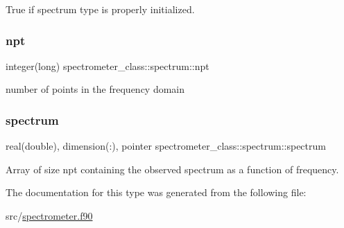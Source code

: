 True if spectrum type is properly initialized. 

\mbox{\label{structspectrometer__class_1_1spectrum_a082d9e0f82565526a83b32fae38df78f}} 
\subsubsection{\texorpdfstring{npt}{npt}}
{\footnotesize\ttfamily integer(long) spectrometer\+\_\+class\+::spectrum\+::npt\hspace{0.3cm}{\ttfamily [private]}}



number of points in the frequency domain 

\mbox{\label{structspectrometer__class_1_1spectrum_a9f42df4722fd9d17f514de0dbe1a50da}} 
\subsubsection{\texorpdfstring{spectrum}{spectrum}}
{\footnotesize\ttfamily real(double), dimension(\+:), pointer spectrometer\+\_\+class\+::spectrum\+::spectrum\hspace{0.3cm}{\ttfamily [private]}}



Array of size npt containing the observed spectrum as a function of frequency. 



The documentation for this type was generated from the following file\+:\begin{DoxyCompactItemize}
\item 
src/\hyperlink{spectrometer_8f90}{spectrometer.\+f90}\end{DoxyCompactItemize}
